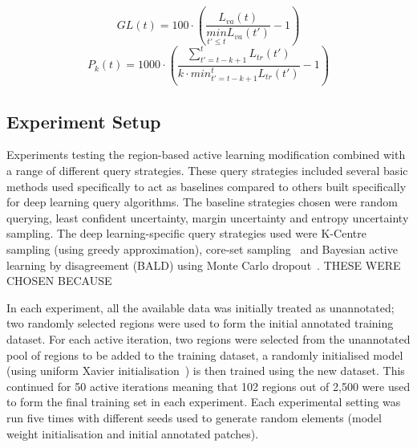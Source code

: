\begin{equation}
	GL(t) = 100 \cdot \left ( \frac{L_{va}(t)}{\underset{t'\leq t}{min}L_{va}(t')} - 1 \right )
	\label{eq:generalization_loss}
\end{equation}
\begin{equation}
	P_k(t) = 1000 \cdot \left ( \frac{\sum_{t'=t-k+1}^{t}L_{tr}(t')}{k \cdot min^{t}_{t'=t-k+1}L_{tr}(t')} - 1\right )
	\label{eq:training_progression}
\end{equation}

\subsection{Experiment Setup}
Experiments testing the region-based active learning modification combined with a range of different query strategies. These query strategies included several basic methods used specifically to act as baselines compared to others built specifically for deep learning query algorithms. The baseline strategies chosen were random querying, least confident uncertainty, margin uncertainty and entropy uncertainty sampling. The deep learning-specific query strategies used were K-Centre sampling (using greedy approximation), core-set sampling~\citep{sener2017active} and Bayesian active learning by disagreement (BALD) using Monte Carlo dropout~\citep{gal2017deep}. THESE WERE CHOSEN BECAUSE

In each experiment, all the available data was initially treated as unannotated; two randomly selected regions were used to form the initial annotated training dataset. For each active iteration, two regions were selected from the unannotated pool of regions to be added to the training dataset, a randomly initialised model (using uniform Xavier initialisation~\citep{glorot2010understanding}) is then trained using the new dataset. This continued for 50 active iterations meaning that 102 regions out of 2,500 were used to form the final training set in each experiment. Each experimental setting was run five times with different seeds used to generate random elements (model weight initialisation and initial annotated patches).

